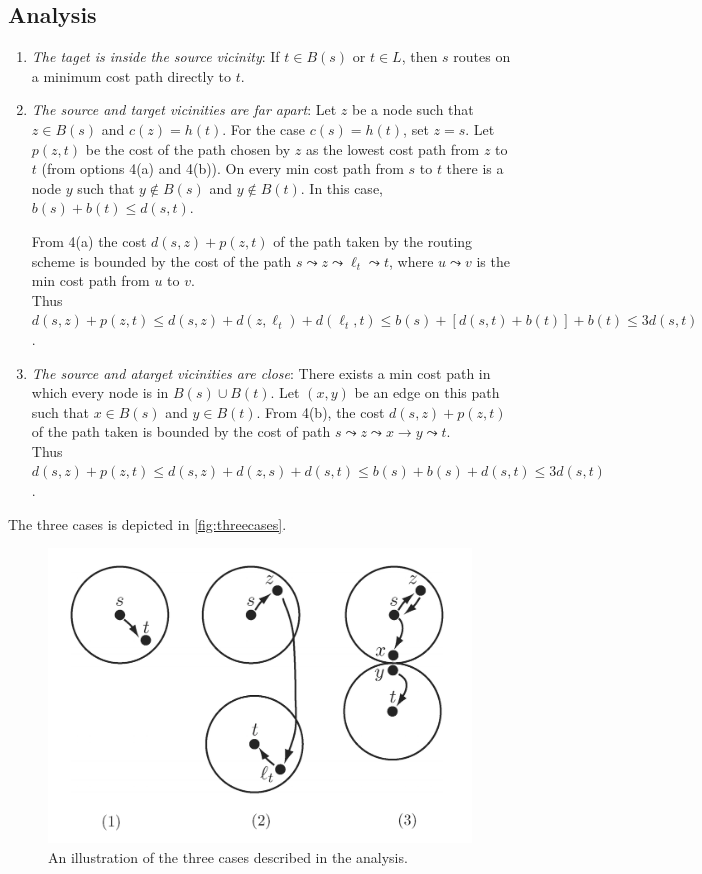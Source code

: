 \subsection{Analysis}
\begin{enumerate}
    \item \textit{The taget is inside the source vicinity}: If $t\in B(s)$ or $t\in L$, then $s$ routes on a minimum cost path directly to $t$.
    \item \textit{The source and target vicinities are far apart}: Let $z$ be a node such that $z\in B(s)$ and $c(z)=h(t)$. For the case $c(s)=h(t)$, set $z=s$. Let $p(z,t)$ be the cost of the path chosen by $z$ as the lowest cost   path from $z$ to $t$ (from options 4(a) and 4(b)).
    On every min cost path from $s$ to $t$ there is a node $y$ such that $y\not\in B(s)$ and $y\not\in B(t)$. In this case, $b(s)+b(t)\leq d(s,t)$.

    From 4(a) the cost $d(s,z)+p(z, t)$ of the path taken by the routing scheme is bounded by the cost of the path $s\leadsto z\leadsto \ell_t\leadsto t$, where $u\leadsto v$ is the min cost path from $u$ to $v$.\\
    Thus $d(s,z)+p(z,t) \leq d(s,z)+d(z,\ell_t)+d(\ell_t,t) \leq b(s) + [d(s,t) + b(t)] + b(t) \leq 3d(s,t)$.
    \item \textit{The source and atarget vicinities are close}: There exists a min cost path in which every node is in $B(s)\cup B(t)$. Let $(x,y)$ be an edge on this path such that $x\in B(s)$ and $y\in B(t)$. From 4(b), the cost $d(s,z)+p(z,t)$ of the path taken is bounded by the cost of path $s\leadsto z\leadsto x\rightarrow y \leadsto t$.\\
    Thus $d(s,z)+p(z,t) \leq d(s,z) + d(z,s) + d(s,t) \leq b(s)+b(s)+d(s,t)\leq 3d(s,t)$.
\end{enumerate}
The three cases is depicted in \autoref{fig:threecases}.

\begin{figure}[htbp]
    \centering
    \includegraphics[scale=0.3]{images/threecases.png} 
    \caption{An illustration of the three cases described in the analysis.}
    \label{fig:threecases}
\end{figure}


